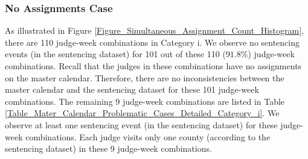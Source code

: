 \documentclass[11pt, oneside]{article}   	%
\theoremstyle{ModifiedStyle}
\begin{document}
\subsubsection{No Assignments Case}
\label{Sec:Master_Calendar:Further_Analysis_of_Some_Assignments:Category_i}
As illustrated in Figure \ref{Figure_Simultaneous_Assignment_Count_Histogram}, there are 110 judge-week combinations in Category i. We observe no sentencing events (in the sentencing dataset) for 101 out of these 110 ($91.8\%$) judge-week combinations. Recall that the judges in these combinations have no assignments on the master calendar. Therefore, there are no inconsistencies between the master calendar and the sentencing dataset for these 101 judge-week combinations. The remaining 9 judge-week combinations are listed in Table \ref{Table_Mater_Calendar_Problematic_Cases_Detailed_Category_i}. We observe at least one sentencing event (in the sentencing dataset) for these judge-week combinations. Each judge visits only one county (according to the sentencing dataset) in these 9 judge-week combinations.
\end{document}
